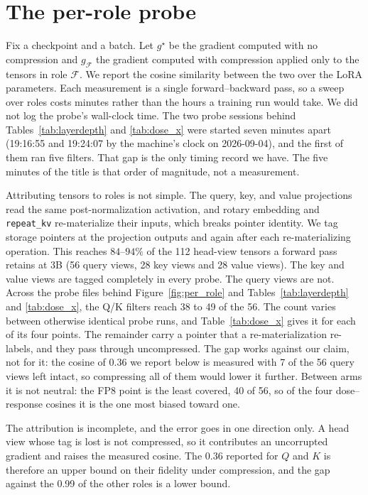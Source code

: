 \documentclass[11pt,letterpaper]{article}
\begin{document}
\section{The per-role probe}
\label{app:probe}

Fix a checkpoint and a batch. Let $g^\star$ be the gradient computed with no compression and $g_{\mathcal{F}}$ the gradient computed with compression applied only to the tensors in role $\mathcal{F}$. We report the cosine similarity between the two over the LoRA parameters. Each measurement is a single forward--backward pass, so a sweep over roles costs minutes rather than the hours a training run would take. We did not log the probe's wall-clock time. The two probe sessions behind Tables~\ref{tab:layerdepth} and \ref{tab:dose_x} were started seven minutes apart (19:16:55 and 19:24:07 by the machine's clock on 2026-09-04), and the first of them ran five filters. That gap is the only timing record we have. The five minutes of the title is that order of magnitude, not a measurement.

Attributing tensors to roles is not simple. The query, key, and value projections read the same post-normalization activation, and rotary embedding and \texttt{repeat\_kv} re-materialize their inputs, which breaks pointer identity. We tag storage pointers at the projection outputs and again after each re-materializing operation. This reaches $84$--$94\%$ of the 112 head-view tensors a forward pass retains at 3B (56 query views, 28 key views and 28 value views). The key and value views are tagged completely in every probe. The query views are not. Across the probe files behind Figure~\ref{fig:per_role} and Tables~\ref{tab:layerdepth} and \ref{tab:dose_x}, the Q/K filters reach 38 to 49 of the 56. The count varies between otherwise identical probe runs, and Table~\ref{tab:dose_x} gives it for each of its four points. The remainder carry a pointer that a re-materialization re-labels, and they pass through uncompressed. The gap works against our claim, not for it: the cosine of $0.36$ we report below is measured with 7 of the 56 query views left intact, so compressing all of them would lower it further. Between arms it is not neutral: the FP8 point is the least covered, 40 of 56, so of the four dose--response cosines it is the one most biased toward one.

The attribution is incomplete, and the error goes in one direction only. A head view whose tag is lost is not compressed, so it contributes an uncorrupted gradient and raises the measured cosine. The 0.36 reported for $Q$ and $K$ is therefore an upper bound on their fidelity under compression, and the gap against the 0.99 of the other roles is a lower bound.
\end{document}
